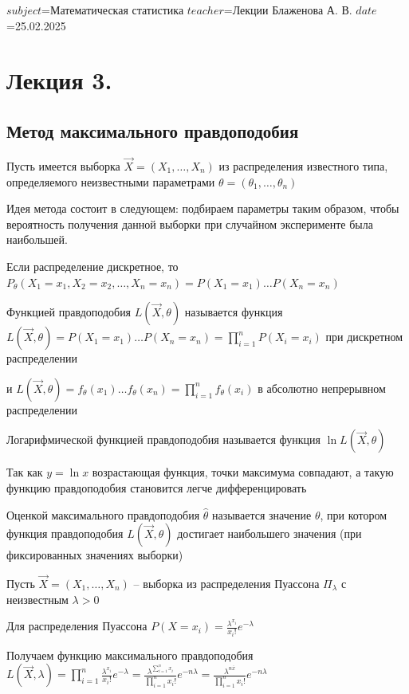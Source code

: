 $subject$=Математическая статистика
$teacher$=Лекции Блаженова А. В.
$date$=25.02.2025

\section{Лекция 3.}

\subsection{Метод максимального правдоподобия}

\hypertarget{maximum_likelihood_estimation}{}

Пусть имеется выборка $\vec{X} = (X_1, \dots, X_n)$ из распределения известного типа, определяемого неизвестными параметрами 
$\theta = (\theta_1, \dots, \theta_n)$

Идея метода состоит в следующем: подбираем параметры таким образом, чтобы вероятность получения
данной выборки при случайном эксперименте была наибольшей.

Если распределение дискретное, то $P_{\theta} (X_1 = x_1, X_2 = x_2, \dots, X_n = x_n) = P(X_1 = x_1) \dots P(X_n = x_n)$

\Def Функцией правдоподобия $L(\vec{X}, \theta)$ называется функция $L(\vec{X}, \theta) = P(X_1 = x_1) \dots P(X_n = x_n) = \prod_{i = 1}^n P(X_i = x_i)$ при дискретном распределении

и $L(\vec{X}, \theta) = f_\theta(x_1) \dots f_\theta(x_n) = \prod_{i = 1}^n f_\theta(x_i)$ в абсолютно непрерывном распределении

\Def Логарифмической функцией правдоподобия называется функция $\ln L(\vec{X}, \theta)$

\Nota Так как $y = \ln x$ возрастающая функция, точки максимума совпадают, а такую функцию правдоподобия становится легче дифференцировать

\Def Оценкой максимального правдоподобия $\hat{\theta}$ называется значение $\theta$, при котором функция правдоподобия 
$L(\vec{X}, \theta)$ достигает наибольшего значения (при фиксированных значениях выборки)

 Пусть $\vec{X} = (X_1, \dots, X_n)$ -- выборка из распределения Пуассона $\Pi_\lambda$ с неизвестным $\lambda > 0$

\Mem Для распределения Пуассона $P(X = x_i) = \frac{\lambda^{x_i}}{x_i!} e^{-\lambda}$

Получаем функцию максимального правдоподобия $L(\vec{X}, \lambda) = \prod_{i = 1}^n \frac{\lambda^{x_i}}{x_i!} e^{-\lambda} = 
\frac{\lambda^{\sum_{i = 1}^n x_i}}{\prod_{i = 1}^n x_i!} e^{-n\lambda} = \frac{\lambda^{n \overline{x}}}{\prod_{i = 1}^n x_i!} e^{-n\lambda}$

